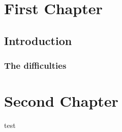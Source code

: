 \documentclass{book}
\begin{document}
\tableofcontents
\chapter{First Chapter}
\section{Introduction}
\subsection{The difficulties}
\chapter{Second Chapter}
test
\end{document}
